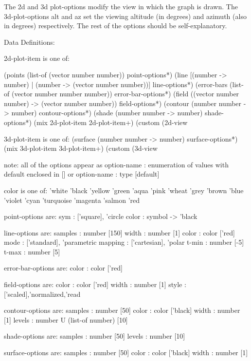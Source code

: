 \documentclass{article}
\begin{document}
{\begin{schemedisplay}
\end{schemedisplay}



The 2d and 3d plot-options modify the view in which the graph is drawn. The 3d-plot-options alt and az set the viewing altitude (in degrees) and azimuth (also in degrees) respectively. The rest of the options should be self-explanatory.



\begin{schemedisplay}
Data Definitions:
     
2d-plot-item is one of:

 (points (list-of (vector number number)) point-options*)
 (line [(number -> number) | (number -> (vector number number))] line-options*)
 (error-bars (list-of (vector number number number)) error-bar-options*)
 (field ((vector number number) -> (vector number number)) field-options*)
 (contour (number number -> number) contour-options*)
 (shade (number number -> number) shade-options*)
 (mix 2d-plot-item 2d-plot-item+)
 (custom (2d-view%
     
3d-plot-item is one of:
 (surface (number number -> number) surface-options*)
 (mix 3d-plot-item 3d-plot-item+)
 (custom (3d-view%

note: all of the options appear as
 option-name : enumeration of values with default enclosed in []
or
 option-name : type [default]

color is one of:
 'white 'black 'yellow 'green 'aqua 'pink
 'wheat 'grey 'brown 'blue 'violet 'cyan
 'turquoise 'magenta 'salmon 'red

point-options are:
 sym       : ['square], 'circle
 color     : symbol -> 'black

line-options are:
 samples   : number [150]
 width     : number [1]
 color     : color ['red]
 mode      : ['standard], 'parametric
 mapping   : ['cartesian], 'polar
 t-min     : number [-5]
 t-max     : number [5]
 
error-bar-options are:
 color     : color ['red]
 
field-options are:
 color     : color ['red]
 width     : number [1]
 style     : ['scaled],'normalized,'read

contour-options are:
 samples   : number [50]
 color     : color ['black]
 width     : number [1]
 levels    : number U (list-of number) [10]

shade-options are:
 samples   : number [50]
 levels    : number [10]

surface-options are:
 samples   : number [50]
 color     : color ['black]
 width     : number [1]
\end{schemedisplay}



}
\end{document}
